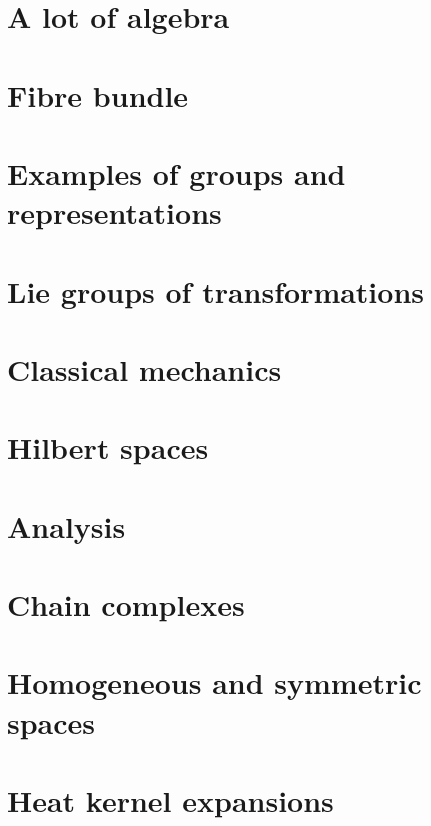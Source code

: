 \chapter{A lot of algebra}




\chapter{Fibre bundle}



\chapter{Examples of groups and representations}        \label{ChapThoComsGroupes}



\chapter{Lie groups of transformations}


\chapter{Classical mechanics}



\chapter{Hilbert spaces}



\chapter{Analysis}








\chapter{Chain complexes}


\chapter{Homogeneous and symmetric spaces}




\chapter{Heat kernel expansions}


